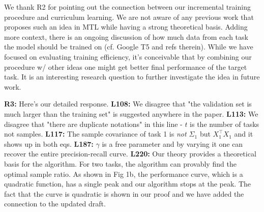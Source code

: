 \documentclass{article}
\begin{document}
We thank R2 for pointing out the connection between our incremental training procedure and curriculum learning.
We are not aware of any previous work that proposes such an idea in MTL while having a strong theoretical basis.
Adding more context, there is an ongoing discussion of how much data from each task the model should be trained on (cf. Google T5 and refs therein).
While we have focused on evaluating training efficiency, it's conceivable that by combining our procedure w/ other ideas one might get better final performance of the target task.
It is an interesting research question to further investigate the idea in future work.

\textbf{R3:}
Here's our detailed response.
\textbf{L108:}
We disagree that "the validation set is much larger than the training set" is suggested anywhere in the paper.
\textbf{L113:} We disagree that "there are duplicate notations" in this line - $t$ is the number of tasks not samples.
\textbf{L117:} The sample covariance of task 1 is \textit{not $\Sigma_1$} but $X_1^{\top}X_1$ and it shows up in both eqs.
\textbf{L187:} $\gamma$ is a free parameter and by varying it one can recover the entire precision-recall curve.
\textbf{L220:} Our theory provides a theoretical basis for the algorithm.
For two tasks, the algorithm can provably find the optimal sample ratio. As shown in Fig 1b, the performance curve, which is a quadratic function, has a single peak and our algorithm stops at the peak.
The fact that the curve is quadratic is shown in our proof and we have added the connection to the updated draft.
\end{document}
